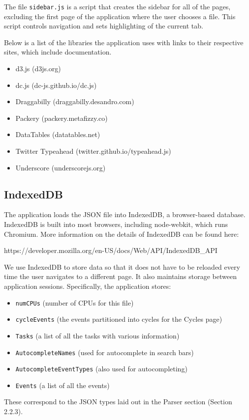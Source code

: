 \documentclass{hmcclinic}
\begin{document}
  The file \texttt{sidebar.js} is a script that creates the sidebar for all of the
  pages, excluding the first page of the application where the user chooses a file.
  This script controls navigation and sets highlighting of the current tab.

  Below is a list of the libraries the application uses with links to
  their respective sites, which include documentation.
\begin{itemize}
\item d3.js (d3js.org)
\item dc.js (dc-js.github.io/dc.js)
\item Draggabilly (draggabilly.desandro.com)
\item Packery (packery.metafizzy.co)
\item DataTables (datatables.net)
\item Twitter Typeahead (twitter.github.io/typeahead.js)
\item Underscore (underscorejs.org)
\end{itemize}

  \subsection{IndexedDB}

  The application loads the JSON file into IndexedDB, a
  browser-based database. IndexedDB is built into most browsers, including
  node-webkit, which runs Chromium. More information on the details of IndexedDB can be found here:
\begin{center}
  https://developer.mozilla.org/en-US/docs/Web/API/IndexedDB\_API
\end{center}
  We use IndexedDB to store data so that it does not have to be reloaded every time the user navigates to a different page. It also
  maintains storage between application sessions.
  Specifically, the application stores:
  \begin{itemize}
    \item \texttt{numCPUs} (number of CPUs for this file)
    \item \texttt{cycleEvents} (the events partitioned into cycles for the Cycles page)
    \item \texttt{Tasks} (a list of all the tasks with various information)
    \item \texttt{AutocompleteNames} (used for autocomplete in search bars)
    \item \texttt{AutocompleteEventTypes} (also used for autocompleting)
    \item \texttt{Events} (a list of all the events)
  \end{itemize}
  These correspond to the JSON types laid
  out in the Parser section (Section 2.2.3).
\end{document}
